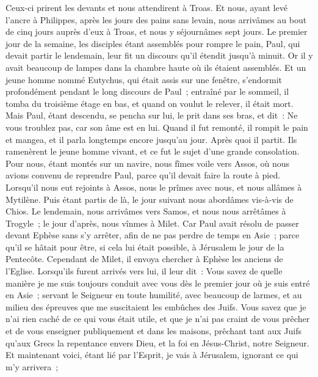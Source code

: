 \begin{multicols}{2}
Ceux-ci prirent les devants et nous attendirent à Troas.
Et nous, ayant levé l'ancre à Philippes, après les jours des pains sans levain, nous arrivâmes au bout de cinq jours auprès d'eux à Troas, et nous y séjournâmes sept jours.
Le premier jour de la semaine, les disciples étant assemblés pour rompre le pain, Paul, qui devait partir le lendemain, leur fit un discours qu'il étendit jusqu'à minuit.
Or il y avait beaucoup de lampes dans la chambre haute où ils étaient assemblés.
Et un jeune homme nommé Eutychus, qui était assis sur une fenêtre, s'endormit profondément pendant le long discours de Paul~; entraîné par le sommeil, il tomba du troisième étage en bas, et quand on voulut le relever, il était mort.
Mais Paul, étant descendu, se pencha sur lui, le prit dans ses bras, et dit~: Ne vous troublez pas, car son âme est en lui.
Quand il fut remonté, il rompit le pain et mangea, et il parla longtemps encore jusqu'au jour. Après quoi il partit.
Ils ramenèrent le jeune homme vivant, et ce fut le sujet d'une grande consolation.
Pour nous, étant montés sur un navire, nous fîmes voile vers Assos, où nous avions convenu de reprendre Paul, parce qu'il devait faire la route à pied.
Lorsqu'il nous eut rejoints à Assos, nous le prîmes avec nous, et nous allâmes à Mytilène.
Puis étant partis de là, le jour suivant nous abordâmes vis-à-vis de Chios. Le lendemain, nous arrivâmes vers Samos, et nous nous arrêtâmes à Trogyle~; le jour d'après, nous vînmes à Milet.
Car Paul avait résolu de passer devant Ephèse sans s'y arrêter, afin de ne pas perdre de temps en Asie~; parce qu'il se hâtait pour être, si cela lui était possible, à Jérusalem le jour de la Pentecôte.
Cependant de Milet, il envoya chercher à Ephèse les anciens de l'Eglise.
Lorsqu'ils furent arrivés vers lui, il leur dit~: Vous savez de quelle manière je me suis toujours conduit avec vous dès le premier jour où je suis entré en Asie~;
servant le Seigneur en toute humilité, avec beaucoup de larmes, et au milieu des épreuves que me suscitaient les embûches des Juifs.
Vous savez que je n'ai rien caché de ce qui vous était utile, et que je n'ai pas craint de vous prêcher et de vous enseigner publiquement et dans les maisons,
prêchant tant aux Juifs qu'aux Grecs la repentance envers Dieu, et la foi en Jésus-Christ, notre Seigneur.
Et maintenant voici, étant lié par l'Esprit, je vais à Jérusalem, ignorant ce qui m'y arrivera~;

\end{multicols}
